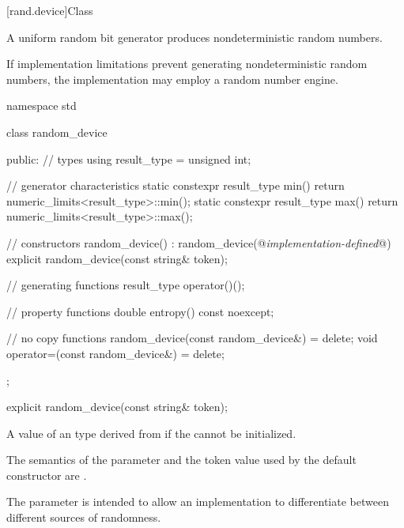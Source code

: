 

[rand.device]{Class }%
%

\pnum
A 
uniform random bit generator
produces nondeterministic random numbers.

\pnum
If implementation limitations
prevent generating nondeterministic random numbers,
the implementation may employ a random number engine.

%
%
\begin{codeblock}
namespace std {
  class random_device {
  public:
    // types
    using result_type = unsigned int;

    // generator characteristics
    static constexpr result_type min() { return numeric_limits<result_type>::min(); }
    static constexpr result_type max() { return numeric_limits<result_type>::max(); }

    // constructors
    random_device() : random_device(@\textit{implementation-defined}@) {}
    explicit random_device(const string& token);

    // generating functions
    result_type operator()();

    // property functions
    double entropy() const noexcept;

    // no copy functions
    random_device(const random_device&) = delete;
    void operator=(const random_device&) = delete;
  };
}
\end{codeblock}


%
\begin{itemdecl}
explicit random_device(const string& token);
\end{itemdecl}

\begin{itemdescr}
\pnum
\throws
A value of an  type
 derived from 
 if the  cannot be initialized.

\pnum
\remarks
 The semantics of the  parameter
 and the token value used by the default constructor are
 .
\begin{footnote}
The parameter is intended
   to allow an implementation to differentiate
   between different sources of randomness.
\end{footnote}
\end{itemdescr}


